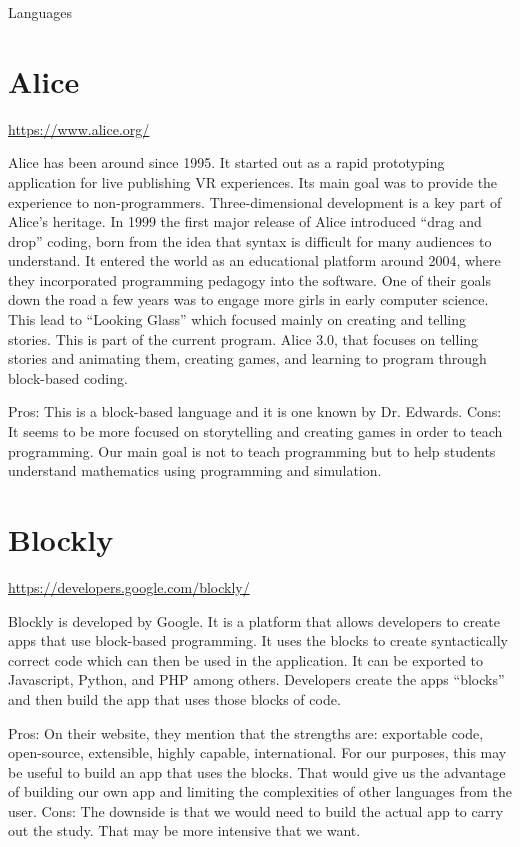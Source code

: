 Languages

\section{Alice}
\url{https://www.alice.org/}

Alice has been around since 1995. It started out as a rapid prototyping application for live publishing VR experiences. Its main goal was to provide the experience to non-programmers. Three-dimensional development is a key part of Alice’s heritage.  In 1999 the first major release of Alice introduced “drag and drop” coding, born from the idea that syntax is difficult for many audiences to understand. It entered the world as an educational platform around 2004, where they incorporated programming pedagogy into the software. One of their goals down the road a few years was to engage more girls in early computer science. This lead to “Looking Glass” which focused mainly on creating and telling stories. This is part of the current program. Alice 3.0, that focuses on telling stories and animating them, creating games, and learning to program through block-based coding. 

Pros: This is a block-based language and it is one known by Dr. Edwards.
Cons: It seems to be more focused on storytelling and creating games in order to teach programming. Our main goal is not to teach programming but to help students understand mathematics using programming and simulation.



\section{Blockly }
\url{https://developers.google.com/blockly/}

Blockly is developed by Google. It is a platform that allows developers to create apps that use block-based programming. It uses the blocks to create syntactically correct code which can then be used in the application. It can be exported to Javascript, Python, and PHP among others. Developers create the apps “blocks” and then build the app that uses those blocks of code. 

Pros: On their website, they mention that the strengths are: exportable code, open-source, extensible, highly capable, international. For our purposes, this may be useful to build an app that uses the blocks. That would give us the advantage of building our own app and limiting the complexities of other languages from the user. 
Cons: The downside is that we would need to build the actual app to carry out the study. That may be more intensive that we want.



